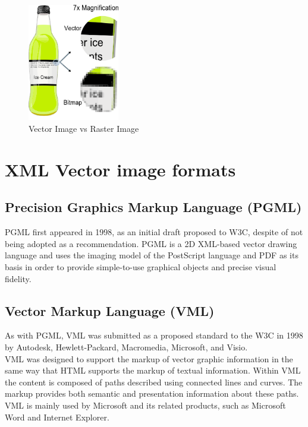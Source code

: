 \documentclass[twocolumn,twoside,10pt,a4paper]{article}
\begin{document}
\begin{figure}[h]
\centering
\includegraphics[width=40mm]{images/vector_bitmap.png}
\caption{Vector Image vs Raster Image}
\label{fig:vector_vs_raster}
\end{figure}

\section{XML Vector image formats}

\subsection{Precision Graphics Markup Language (PGML)}

PGML first appeared in 1998, as an initial draft proposed to W3C, despite of not being adopted as a recommendation\cite{w3c:pgml}. PGML is a 2D XML-based vector drawing language and uses the imaging model of the PostScript language and PDF as its basis in order to provide simple-to-use graphical objects and precise visual fidelity.

\subsection{Vector Markup Language (VML)}

As with PGML, VML was submitted as a proposed standard to the W3C in 1998 by Autodesk, Hewlett-Packard, Macromedia, Microsoft, and Visio.\\

VML was designed to support the markup of vector graphic information in the same way that HTML supports the markup of textual information. Within VML the content is composed of paths described using connected lines and curves. The markup provides both semantic and presentation information about these paths.\\

VML is mainly used by Microsoft and its related products, such as Microsoft Word and Internet Explorer.
\end{document}
